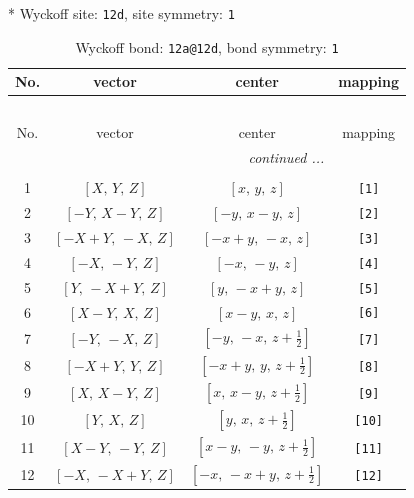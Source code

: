 \documentclass[fleqn,8pt]{jsarticle}
\begin{document}
* Wyckoff site: {\tt 12d}, site symmetry: {\tt 1}
\renewcommand{\arraystretch}{1.2}
\begin{longtable}{cccc}
\caption{Wyckoff bond: {\tt 12a@12d}, bond symmetry: {\tt 1}}
 \\
 \hline \hline
No. & vector & center & mapping \\ \hline \endfirsthead

\multicolumn{3}{l}{\tablename\ \thetable{}} \\
 \hline \hline
No. & vector & center & mapping \\ \hline \endhead

 \hline \hline
\multicolumn{3}{r}{\footnotesize\it continued ...} \\ \endfoot

 \hline \hline
\multicolumn{3}{r}{} \\ \endlastfoot

1 & $\left[ X,\, Y,\, Z \right]$ & $\left[ x,\, y,\, z \right]$ & {\tt [1]} \\ \hline
2 & $\left[ - Y,\, X - Y,\, Z \right]$ & $\left[ - y,\, x - y,\, z \right]$ & {\tt [2]} \\ \hline
3 & $\left[ - X + Y,\, - X,\, Z \right]$ & $\left[ - x + y,\, - x,\, z \right]$ & {\tt [3]} \\ \hline
4 & $\left[ - X,\, - Y,\, Z \right]$ & $\left[ - x,\, - y,\, z \right]$ & {\tt [4]} \\ \hline
5 & $\left[ Y,\, - X + Y,\, Z \right]$ & $\left[ y,\, - x + y,\, z \right]$ & {\tt [5]} \\ \hline
6 & $\left[ X - Y,\, X,\, Z \right]$ & $\left[ x - y,\, x,\, z \right]$ & {\tt [6]} \\ \hline
7 & $\left[ - Y,\, - X,\, Z \right]$ & $\left[ - y,\, - x,\, z + \frac{1}{2} \right]$ & {\tt [7]} \\ \hline
8 & $\left[ - X + Y,\, Y,\, Z \right]$ & $\left[ - x + y,\, y,\, z + \frac{1}{2} \right]$ & {\tt [8]} \\ \hline
9 & $\left[ X,\, X - Y,\, Z \right]$ & $\left[ x,\, x - y,\, z + \frac{1}{2} \right]$ & {\tt [9]} \\ \hline
10 & $\left[ Y,\, X,\, Z \right]$ & $\left[ y,\, x,\, z + \frac{1}{2} \right]$ & {\tt [10]} \\ \hline
11 & $\left[ X - Y,\, - Y,\, Z \right]$ & $\left[ x - y,\, - y,\, z + \frac{1}{2} \right]$ & {\tt [11]} \\ \hline
12 & $\left[ - X,\, - X + Y,\, Z \right]$ & $\left[ - x,\, - x + y,\, z + \frac{1}{2} \right]$ & {\tt [12]} \\
\end{longtable}
\end{document}
